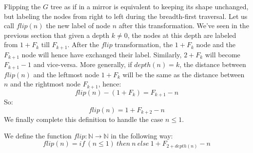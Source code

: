 \documentclass[a4paper,11pt]{article}
\begin{document}
Flipping the $G$ tree as if in a mirror is equivalent to keeping
its shape unchanged, but labeling the nodes from right to left
during the breadth-first traversal. Let us call $flip(n)$ the
new label of node $n$ after this transformation.
We've seen in the previous section that given a depth $k\neq 0$,
the nodes at this depth are labeled from $1+F_k$ till $F_{k+1}$.
After the $flip$ transformation, the $1+F_k$ node and
the $F_{k+1}$ node will hence have exchanged their label.
Similarly, $2+F_k$ will become $F_{k+1}-1$ and vice-versa.
More generally, if $depth(n)=k$, the distance between
$flip(n)$ and the leftmost node $1+F_{k}$ will be the same
as the distance between $n$ and the rightmost node $F_{k+1}$,
hence:
$$flip(n) - (1+F_{k}) = F_{k+1} - n$$
So:
$$flip(n) = 1+F_{k+2}-n$$
We finally complete this definition to handle the case $n\le 1$.
\begin{definition}
We define the function $flip : \mathbb{N}\to\mathbb{N}$
in the following way:
$$flip(n) = if~(n\le 1)~then~n~else~1+F_{2+depth(n)}-n$$
\end{definition}
\end{document}
